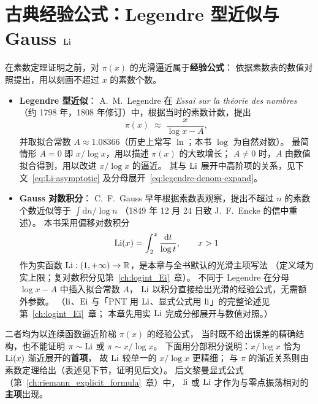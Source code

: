 \section{古典经验公式：Legendre 型近似与 Gauss \texorpdfstring{$\operatorname{Li}$}{Li}}\label{sec:classical_main_terms}

在素数定理证明之前，对 $\pi(x)$ 的光滑逼近属于\textbf{经验公式}：
依据素数表的数值对照提出，用以刻画不超过 $x$ 的素数个数。

\begin{itemize}
  \item \textbf{Legendre 型近似}：
    A.~M.~Legendre 在 \textit{Essai sur la th\'{e}orie des nombres}
    （约 1798 年，1808 年修订）中，根据当时的素数计数，提出
    \[
      \pi(x)\;\approx\;\frac{x}{\log x-A},
    \]
    并取拟合常数 $A\approx 1.08366$（历史上常写 $\ln$；本书 $\log$ 为自然对数）。
    最简情形 $A=0$ 即 $x/\log x$，用以描述 $\pi(x)$ 的大致增长；
    $A\neq 0$ 时，$A$ 由数值拟合得到，用以改进 $x/\log x$ 的逼近。
    其与 $\operatorname{Li}$ 展开中高阶项的关系，见下文~\eqref{eq:Li-asymptotic} 及分母展开~\eqref{eq:legendre-denom-expand}。
  \item \textbf{Gauss 对数积分}：
    C.~F.~Gauss 早年根据素数表观察，提出不超过 $n$ 的素数个数近似等于
    $\int \mathrm{d}n/\log n$
    （1849 年 12 月 24 日致 J.~F.~Encke 的信中重述）。
    本书采用偏移对数积分
    \begin{equation}
    \operatorname{Li}(x) = \int_2^x \frac{\mathrm{d}t}{\log t}, \qquad x > 1
    \label{eq:Li-def-parts}
    \end{equation}
    作为实函数 $\operatorname{Li}:(1,+\infty)\to\mathbb{R}$，是本章与全书默认的光滑主项写法
    （定义域为实上限；复对数积分见第~\ref{ch:logint_Ei}~章）。
    不同于 Legendre 在分母 $\log x-A$ 中插入拟合常数 $A$，
    $\operatorname{Li}$ 以积分直接给出光滑的经验公式，无需额外参数。
    （$\operatorname{li}$、$\operatorname{Ei}$ 与「PNT 用 $\operatorname{Li}$、显式公式用 $\operatorname{li}$」的完整论述见第~\ref{ch:logint_Ei}~章；
    本章先用实 $\operatorname{Li}$ 完成分部展开与数值对照。）
\end{itemize}

二者均为以连续函数逼近阶梯 $\pi(x)$ 的经验公式，
当时既不给出误差的精确结构，也不能证明 $\pi\sim\operatorname{Li}$ 或 $\pi\sim x/\log x$。
下面用分部积分说明：$x/\log x$ 恰为 $\operatorname{Li}(x)$ 渐近展开的\textbf{首项}，
故 $\operatorname{Li}$ 较单一的 $x/\log x$ 更精细；
与 $\pi$ 的渐近关系则由素数定理给出（表述见下节，证明见后文）。
后文黎曼显式公式（第~\ref{ch:riemann_explicit_formula}~章）中，
$\operatorname{li}$ 或 $\operatorname{Li}$ 才作为与零点振荡相对的\textbf{主项}出现。

